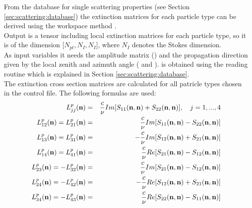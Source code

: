 \label{sec:scattering:ext_mat_gas}

\label{sec:scattering:ext_mat_spt}

From the database for single scattering properties (see Section 
\ref{sec:scattering:database}) the extinction matrices for each
particle type can be derived using the workspace method
.\\
Output is a tensor including local extinction matrices for each
particle type, so it is of the dimension [$N_{pt}, N_{I}, N_{I}$],
where $N_{I}$ denotes the Stokes dimension.\\

As input variables it needs the amplitude matrix ()
and the propagation direction given by the local zenith and azimuth
angle ( and ).  is
obtained using the reading routine  which is
explained in Section \ref{sec:scattering:database}.\\

The extinction cross section matrices \SExMat{} are
calculated for all patricle types chosen in the control
file. The following formulas are used:
\begin{eqnarray}
  \label{eq:gen_ext_matrix}
  L^p_{jj}({\bf n}) &=& \frac{c}{\nu} Im[S_{11}({\bf n},{\bf
    n})+S_{22}({\bf n},{\bf n})], \quad j=1,...,4 \\
  L^p_{12}({\bf n}) = L^p_{21}({\bf n}) &=& \frac{c}{\nu} Im[S_{11}({\bf n},{\bf
    n})-S_{22}({\bf n},{\bf n})]\\
  L^p_{13}({\bf n}) = L^p_{31}({\bf n}) &=& -\frac{c}{\nu} Im[S_{12}({\bf n},{\bf
    n})+S_{21}({\bf n},{\bf n})]\\
  L^p_{14}({\bf n}) = L^p_{41}({\bf n}) &=& \frac{c}{\nu} Re[S_{21}({\bf n},{\bf
    n})-S_{12}({\bf n},{\bf n})]\\
  L^p_{23}({\bf n}) = -L^p_{32}({\bf n}) &=& \frac{c}{\nu} Im[S_{21}({\bf n},{\bf
    n})-S_{12}({\bf n},{\bf n})]\\
  L^p_{24}({\bf n}) = -L^p_{42}({\bf n}) &=& -\frac{c}{\nu} Re[S_{12}({\bf n},{\bf
    n})+S_{21}({\bf n},{\bf n})]\\
  L^p_{34}({\bf n}) = -L^p_{43}({\bf n}) &=& \frac{c}{\nu} Re[S_{22}({\bf n},{\bf
    n})-S_{11}({\bf n},{\bf n})]
\end{eqnarray}


